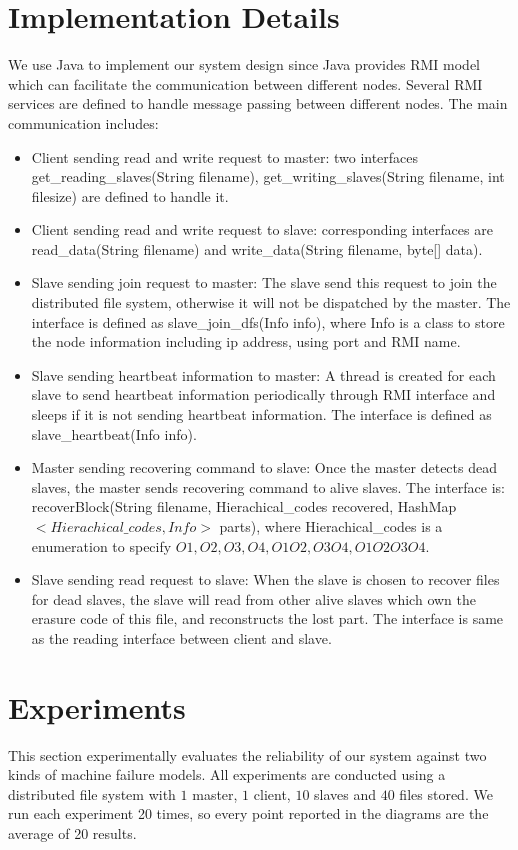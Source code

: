 \documentclass[conference]{IEEEtran}
\begin{document}
\section{Implementation Details}
We use Java to implement our system design since Java provides RMI model\cite{RMI} which can facilitate the communication between different nodes.
Several RMI services are defined to handle message passing between different nodes. The main communication includes:
\begin{itemize}
\item Client sending read and write request to master: two interfaces get\_reading\_slaves(String filename), get\_writing\_slaves(String filename, int filesize) are defined to handle it.
\item Client sending read and write request to slave:  corresponding interfaces are read\_data(String filename) and write\_data(String filename, byte[] data).
\item Slave sending join request to master: The slave send this request to join the distributed file system, otherwise it will not be dispatched by the master. The interface is defined as slave\_join\_dfs(Info info), where Info is a class to store the node information including ip address, using port and RMI name.
\item Slave sending heartbeat information to master: A thread is created for each slave to send heartbeat information periodically through RMI interface and sleeps if it is not sending heartbeat information. The interface is defined as slave\_heartbeat(Info info).
\item Master sending recovering command to slave: Once the master detects dead slaves, the master sends recovering command to alive slaves.  The interface is: recoverBlock(String filename, Hierachical\_codes recovered,
			HashMap$<Hierachical\_codes, Info>$ parts), where Hierachical\_codes is a enumeration to specify $O1,O2,O3,O4,O1O2,O3O4,O1O2O3O4$.
\item Slave sending read request to slave: When the slave is chosen to  recover files for dead slaves, the slave will read from other alive slaves which own the erasure code of this file, and reconstructs the lost part. The interface is same as the reading interface between client and slave.
\end{itemize}
\section{Experiments}
This section experimentally evaluates the reliability of our system against two kinds of machine failure models. All experiments are conducted using a distributed file system with $1$ master, $1$ client, $10$ slaves and $40$ files stored. We run each experiment 20 times, so every point reported in the diagrams are the average of 20 results.
\end{document}
